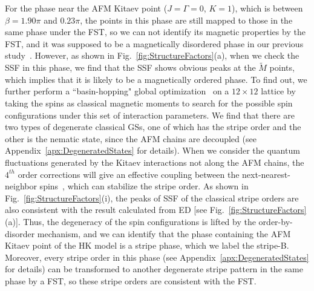 \documentclass[aps,prb,reprint,amsfonts,amsmath,amssymb,showpacs,groupedaddress,superscriptaddress]{revtex4-1}
\begin{document}
For the phase near the AFM Kitaev point ($J=\Gamma=0$, $K=1$), which is between $\beta=1.90\pi$ and $0.23\pi$,  the points in this phase are still mapped to those in the same phase under the FST, so we can not identify its magnetic properties by the FST, and it was supposed to be a magnetically disordered phase in our previous study~\cite{KaiLi2015}. However, as shown in Fig.~\ref{fig:StructureFactors}(a), when we check the SSF in this phase, we find that the SSF shows obvious peaks at the $\tilde{M}$ points, which implies that it is likely to be a magnetically ordered phase. To find out, we further perform a ``basin-hopping" global optimization~\cite{jp970984n} on a $12 \times 12$ lattice by taking the spins as classical magnetic moments to search for the possible spin configurations under this set of interaction parameters. We find that there are two types of degenerate classical GSs, one of which has the stripe order and the other is the nematic state, since the AFM chains are decoupled (see Appendix~\ref{apx:DegeneratedStates} for details). When we consider the quantum fluctuations generated by the Kitaev interactions not along the AFM chains, the $4^{th}$ order corrections will give an effective coupling between the next-nearest-neighbor spins~\cite{PhysRevB.92.184416}, which can stabilize the stripe order. As shown in Fig.~\ref{fig:StructureFactors}(i), the peaks of SSF of the classical stripe orders are also consistent with the result calculated from ED [see Fig.~\ref{fig:StructureFactors}(a)]. Thus, the degeneracy of the spin configurations is lifted by the order-by-disorder mechanism, and we can identify that the phase containing the AFM Kitaev point of the HK model is a stripe phase, which we label the stripe-B. Moreover, every stripe order in this phase (see Appendix~\ref{apx:DegeneratedStates} for details) can be transformed to another degenerate stripe pattern in the same phase by a FST, so these stripe orders are consistent with the FST.

\end{document}
